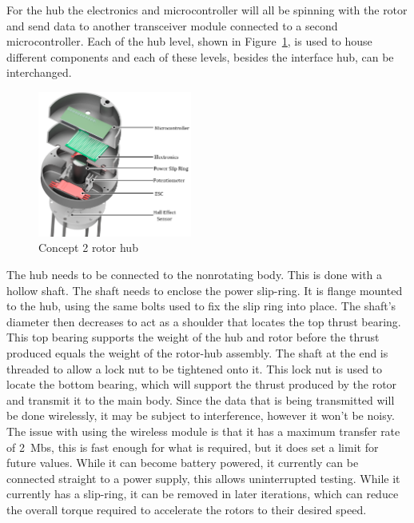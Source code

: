             For the hub the electronics and microcontroller will all be spinning with the rotor and send data to another transceiver module connected to a second microcontroller. Each of the hub level, shown in Figure~\ref{fig: inner_hub_concept_2}, is used to house different components and each of these levels, besides the interface hub, can be interchanged.
            \begin{figure} [h]               
                \centering
                \includegraphics*[width = 0.45\textwidth]{figs/Design/Hub/Hub_Assembly_Concept_2_Labled.png}
                \caption[Sectioned hub view]{Concept 2 rotor hub}
                \label{fig: inner_hub_concept_2}
            \end{figure}
            The hub needs to be connected to the nonrotating body. This is done with a hollow shaft. The shaft needs to enclose the power slip-ring. It is flange mounted to the hub, using the same bolts used to fix the slip ring into place. The shaft's diameter then decreases to act as a shoulder that locates the top thrust bearing. This top bearing supports the weight of the hub and rotor before the thrust produced equals the weight of the rotor-hub assembly. The shaft at the end is threaded to allow a lock nut to be tightened onto it. This lock nut is used to locate the bottom bearing, which will support the thrust produced by the rotor and transmit it to the main body.
            Since the data that is being transmitted will be done wirelessly, it may be subject to interference, however it won't be noisy. The issue with using the wireless module is that it has a maximum transfer rate of 2~Mbs, this is fast enough for what is required, but it does set a limit for future values. While it can become battery powered, it currently can be connected straight to a power supply, this allows uninterrupted testing. While it currently has a slip-ring, it can be removed in later iterations, which can reduce the overall torque required to accelerate the rotors to their desired speed.


